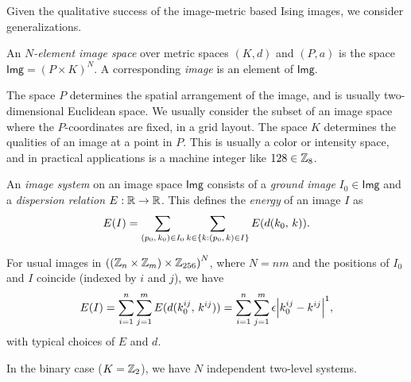 \documentclass[../notebook.tex]{subfiles}
\newcommand{\imsp}{\mathsf{Img}}
\begin{document}

Given the qualitative success of the image-metric based Ising images, we
consider generalizations.

\begin{defn}
  An \emph{$N$-element image space} over metric spaces $(K, d)$ and $(P, a)$ is
  the space $\imsp = {(P \times K)}^N$. A corresponding \emph{image} is an
  element of $\imsp$.

  The space $P$ determines the spatial arrangement of the image, and is usually
  two-dimensional Euclidean space. We usually consider the subset of an image
  space where the $P$-coordinates are fixed, in a grid layout. The space $K$
  determines the qualities of an image at a point in $P$. This is usually a
  color or intensity space, and in practical applications is a machine integer
  like $128 \in \mathbb{Z}_8$.
\end{defn}

\begin{defn}
  An \emph{image system} on an image space $\imsp$ consists of a \emph{ground
  image} $I_0 \in \imsp$ and a \emph{dispersion relation} $E:\mathbb{R} \to \mathbb{R}$. This
  defines the \emph{energy} of an image $I$ as
  \[
    E(I)
    = \sum_{(p_0,\, k_0) \in I_0}
    \sum_{k \in \qty{k : (p_0,\, k) \in I}}
    E(d(k_0,\, k)).
  \]
\end{defn}

\begin{eg}
  For usual images in ${((\mathbb{Z}_n \times \mathbb{Z}_m) \times \mathbb{Z}_{256})}^N$, where $N =
  nm$ and the positions of $I_0$ and $I$ coincide (indexed by $i$ and $j$), we
  have
  \[
    E(I)
    = \sum_{i = 1}^n \sum_{j = 1}^m E(d(k_0^{ij},\, k^{ij}))
    = \sum_{i = 1}^n \sum_{j = 1}^m \epsilon\abs{k_0^{ij} - k^{ij}}^1,
  \]
  with typical choices of $E$ and $d$.
\end{eg}

In the binary case ($K = \mathbb{Z}_2$), we have $N$ independent two-level
systems.
\end{document}
